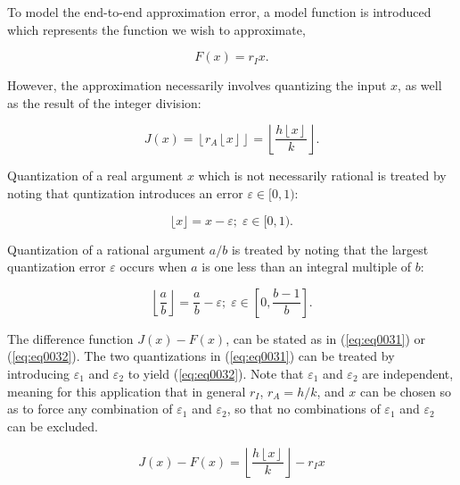 \documentclass{esub2acm}
\begin{document}
To model the end-to-end approximation error, a model function
is introduced which represents the function we wish to approximate,

\begin{equation}
\label{eq:eq0001}
F(x)=r_{I}x .
\end{equation}

However, the approximation necessarily involves quantizing
the input $x$, as well as the result of the integer division:

\begin{equation}
\label{eq:eq0006}
J(x) = \left\lfloor {r_A \left\lfloor x \right\rfloor } \right\rfloor
   = \left\lfloor {\frac{{h\left\lfloor x \right\rfloor }}{k}} \right\rfloor .
\end{equation}

Quantization of a real argument $x$ which is not necessarily
rational is treated by noting that quntization introduces an
error $\varepsilon \in [0,1)$:

\begin{equation}
\lfloor x \rfloor = x - \varepsilon; \; \varepsilon \in [0,1) .
\end{equation}

Quantization of a rational argument $a/b$ is treated
by noting that the largest quantization error $\varepsilon$
occurs when $a$ is one less than an integral multiple of
$b$:

\begin{equation}
\left\lfloor {\frac{a}{b}} \right\rfloor
=
\frac{a}{b} - \varepsilon; \;
\varepsilon \in
\left[ {0, \frac{b-1}{b}} \right] .
\end{equation}

The difference function $J(x)-F(x)$, can be stated
as in (\ref{eq:eq0031}) or (\ref{eq:eq0032}).  The two quantizations in (\ref{eq:eq0031})
can be treated by introducing $\varepsilon_{1}$
and $\varepsilon_{2}$ to yield (\ref{eq:eq0032}).
Note that $\varepsilon_{1}$ and $\varepsilon_{2}$
are independent, meaning for this application that in general $r_I$,
$r_A = h/k$, and $x$ can be
chosen so as to force any combination of $\varepsilon_{1}$ and
$\varepsilon_{2}$, so that no combinations of $\varepsilon_{1}$ and $\varepsilon_{2}$
can be excluded.

\begin{equation}
\label{eq:eq0031}
J(x) - F(x) = \left\lfloor {\frac{{h\left\lfloor x \right\rfloor
     }}{k}} \right\rfloor  - r_I x
\end{equation}
\end{document}
